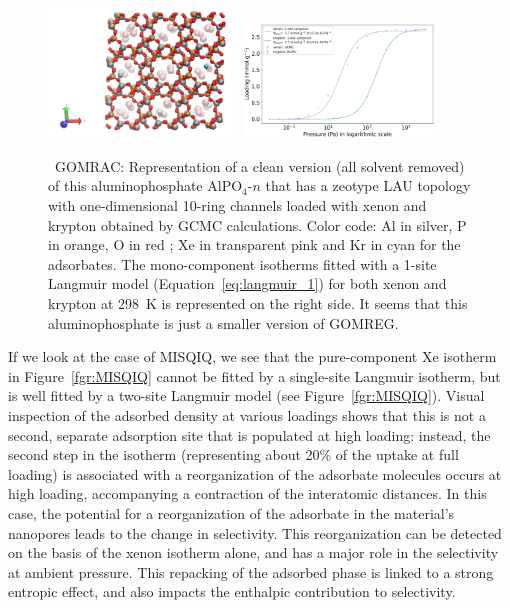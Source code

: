 \documentclass[main.tex]{subfiles}
\begin{document}
\begin{figure}[h]
  \centering
    \includegraphics[width=0.45\textwidth]{figures/2-thermo/GOMRAC_clean.jpg}
    \includegraphics[width=0.45\textwidth]{figures/2-thermo/GOMRAC_clean_isotherm_xenon_krypton_298K.jpg}
    \caption{\ GOMRAC: Representation of a clean version (all solvent removed) of this aluminophosphate AlPO$_4$-$n$ that has a zeotype LAU topology with one-dimensional 10-ring channels loaded with xenon and krypton obtained by GCMC calculations. Color code: Al in silver, P in orange, O in red ; Xe in transparent pink and Kr in cyan for the adsorbates. The mono-component isotherms fitted with a 1-site Langmuir model (Equation~\ref{eq:langmuir_1}) for both xenon and krypton at \SI{298}{\kelvin} is represented on the right side. It seems that this aluminophosphate is just a smaller version of GOMREG.}
    \label{fgr:SI:examples:GOMRAC}
  \end{figure}

If we look at the case of MISQIQ, we see that the pure-component Xe isotherm in Figure~\ref{fgr:MISQIQ} cannot be fitted by a single-site Langmuir isotherm, but is well fitted by a two-site Langmuir model (see Figure~\ref{fgr:MISQIQ}). Visual inspection of the adsorbed density at various loadings shows that this is not a second, separate adsorption site that is populated at high loading: instead, the second step in the isotherm (representing about {20\%} of the uptake at full loading) is associated with a reorganization of the adsorbate molecules occurs at high loading, accompanying a contraction of the interatomic distances. In this case, the potential for a reorganization of the adsorbate in the material's nanopores leads to the change in selectivity. This reorganization can be detected on the basis of the xenon isotherm alone, and has a major role in the selectivity at ambient pressure. This repacking of the adsorbed phase is linked to a strong entropic effect, and also impacts the enthalpic contribution to selectivity.
\end{document}
